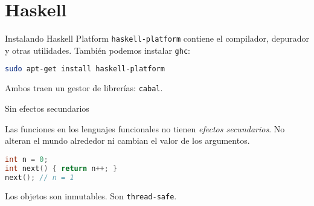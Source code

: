 \section{Haskell}

\begin{frame}[fragile]{Instalando Haskell Platform}
  \texttt{haskell-platform} contiene el compilador, depurador y otras utilidades.
  También podemos instalar \texttt{ghc}:
  \espacio
  \begin{lstlisting}[language=bash]
sudo apt-get install haskell-platform
  \end{lstlisting}
  \espacio
  Ambos traen un gestor de librerías: \texttt{cabal}.

\end{frame}

\begin{frame}[fragile]{Sin efectos secundarios}

    Las funciones en los lenguajes funcionales no tienen \textit{efectos secundarios}.
    No alteran el mundo alrededor ni cambian el valor de los argumentos.
    \espacio
  \begin{lstlisting}[language=C++]
int n = 0;
int next() { return n++; }
next(); // n = 1
  \end{lstlisting}
    Los objetos son inmutables. Son \texttt{thread-safe}.

\end{frame}

